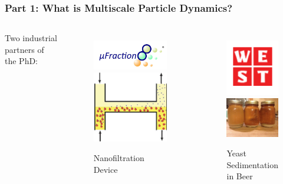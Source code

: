 \documentclass[aspectratio=169,xcolor=dvipsnames]{beamer}
\begin{document}
\begin{frame}
	\frametitle{Part 1: What is Multiscale Particle Dynamics?}
	
	\begin{columns}
			Two industrial partners of the PhD:
		\begin{figure}
			\includegraphics[width=4cm]{ufraction8.png}
			\includegraphics[width=4cm]{Microfilter.png}
			\caption{Nanofiltration Device}
		\end{figure}

		\begin{figure}
			\includegraphics[width=3.5cm]{west.png}\\
			\includegraphics[width=3.5cm]{beer.jpg}
			\caption{Yeast Sedimentation in Beer}
		\end{figure}
	\end{columns}
\end{frame}
\end{document}
